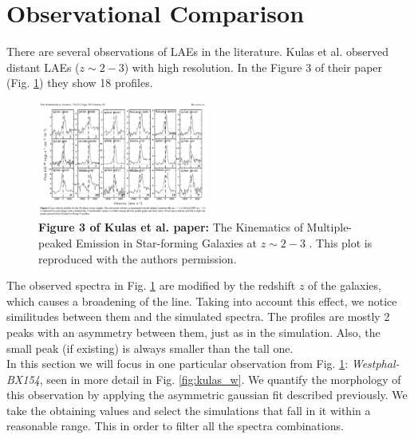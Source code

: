 \documentclass[twocolappendix]{latex/emulateapj}
\begin{document}
\section{Observational Comparison}
\label{sec:comparisonobservations}

There are several observations of LAEs in the literature. Kulas et al. \cite{Kulas12} observed distant LAEs ($z\sim2-3$) with high resolution. In the Figure 3 of their paper (Fig. \ref{fig:kulas}) they show 18 \lya profiles. \\

\begin{figure}[h!]
	\begin{center}
		\includegraphics[width=0.5\textwidth]{./figures/figure3_kulas}
	\end{center}
	\caption{\textbf{Figure 3 of Kulas et al. paper:} The Kinematics of Multiple-peaked \lya Emission in Star-forming Galaxies at $z\sim2-3$ \cite{Kulas12}. This plot is reproduced with the authors permission.
		\label{fig:kulas}}
\end{figure}

The observed spectra in Fig. \ref{fig:kulas} are modified by the redshift $z$ of the galaxies, which causes a broadening of the line. Taking into account this effect, we notice similitudes between them and the simulated spectra. The \lya profiles are mostly 2 peaks with an asymmetry between them, just as in the simulation. Also, the small peak (if existing) is always smaller than the tall one.\\

In this section we will focus in one particular observation from Fig. \ref{fig:kulas}: \textit{Westphal-BX154}, seen in more detail in Fig. \ref{fig:kulas_w}. We quantify the morphology of this observation by applying the asymmetric gaussian fit described previously. We take the obtaining values and select the simulations that fall in it within a reasonable range. This in order to filter all the spectra combinations.\\
\end{document}
